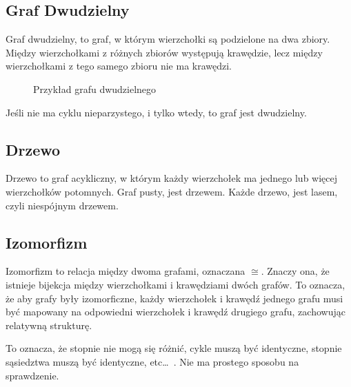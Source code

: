 \documentclass{../notatki}
\begin{document}
\subsection{Graf Dwudzielny}

Graf dwudzielny, to graf, w którym wierzchołki są podzielone na dwa zbiory.
Między wierzchołkami z różnych zbiorów występują krawędzie, lecz
między wierzchołkami z tego samego zbioru nie ma krawędzi.

\begin{figure}[h]
  \centering
  \caption{Przykład grafu dwudzielnego}
\end{figure}

Jeśli nie ma cyklu nieparzystego, i tylko wtedy, to graf jest dwudzielny.

\subsection{Drzewo}

Drzewo to graf acykliczny, w którym każdy wierzchołek ma jednego lub więcej
wierzchołków potomnych. Graf pusty, jest drzewem. Każde drzewo, jest lasem,
czyli niespójnym drzewem.

\subsection{Izomorfizm}

Izomorfizm to relacja między dwoma grafami, oznaczana $\cong$. Znaczy ona, że
istnieje bijekcja między wierzchołkami i krawędziami dwóch grafów. To
oznacza, że
aby grafy były izomorficzne, każdy wierzchołek i krawędź jednego grafu musi być
mapowany na odpowiedni wierzchołek i krawędź drugiego grafu,
zachowując relatywną strukturę.

To oznacza, że stopnie nie mogą się różnić, cykle muszą być identyczne, stopnie
sąsiedztwa muszą być identyczne, etc\dots \ . Nie ma prostego sposobu
na sprawdzenie.
\end{document}

